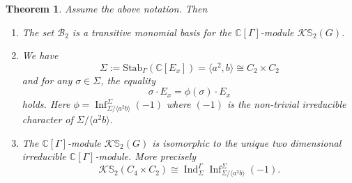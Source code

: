 \documentclass[12pt]{article}
\theoremstyle{plain}
\newtheorem{theorem}{Theorem}[section]
\theoremstyle{definition}
\newcommand{\kerlint}{\mathbb S_2}
\newcommand{\ind}{\operatorname{Ind}}
\newcommand{\infl}{\operatorname{Inf}}
\begin{document}
\begin{theorem}
    Assume the above notation. Then
    \begin{enumerate}
        \item[(i)] The set $\mathcal{B}_2$ is a transitive monomial basis for the $\mathbb C[\Gamma]$-module $\mathcal{K}\kerlint(G)$.
        \item[(ii)] We have \[\Sigma:= \text{Stab}_\Gamma(\mathbb C[E_x]) = \langle a^2, b\rangle\cong C_2\times C_2\] and for any $\sigma\in\Sigma$, the equality
        \[\sigma\cdot E_x = \phi(\sigma)\cdot E_x\]
        holds. Here $\phi = \infl_{\Sigma/\langle a^2b\rangle}^\Sigma (-1)$ where $(-1)$ is the non-trivial irreducible character of $\Sigma/\langle a^2b\rangle$.
        \item[(iii)] The $\mathbb C[\Gamma]$-module $\mathcal{K}\kerlint(G)$ is isomorphic to the unique two dimensional irreducible $\mathbb C[\Gamma]$-module. More precisely
        \[
        \mathcal{K}\kerlint(C_4\times C_2) \cong \ind_\Sigma^\Gamma\infl_{\Sigma/\langle a^2b\rangle}^\Sigma (-1).
        \]
    \end{enumerate}
\end{theorem}
\end{document}
